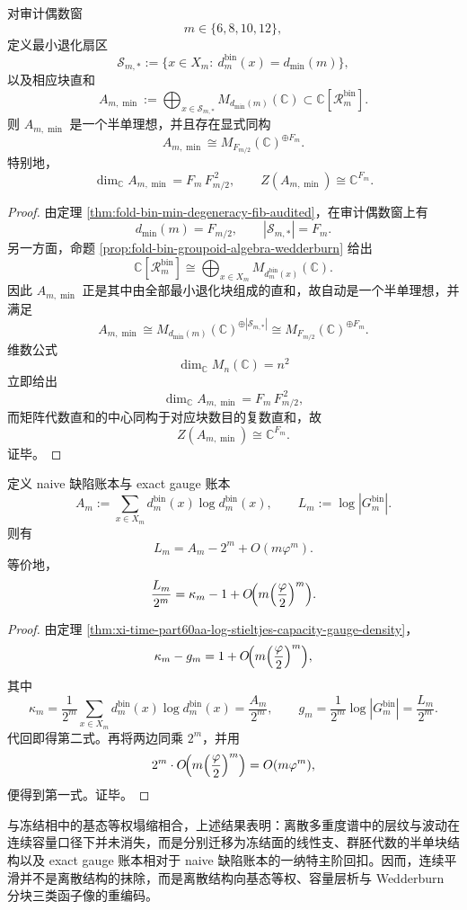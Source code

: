 \begin{proposition}\label{prop:xi-time-part60aaa-audited-even-minideal-fibonacci-semisimple}
对审计偶数窗
\[
m\in\{6,8,10,12\},
\]
定义最小退化扇区
\[
\mathcal S_{m,*}:=\{x\in X_m:\ d_m^{\mathrm{bin}}(x)=d_{\min}(m)\},
\]
以及相应块直和
\[
A_{m,\min}
:=
\bigoplus_{x\in\mathcal S_{m,*}}M_{d_{\min}(m)}(\mathbb C)
\subset
\mathbb C[\mathcal R_m^{\mathrm{bin}}].
\]
则 \(A_{m,\min}\) 是一个半单理想，并且存在显式同构
\[
A_{m,\min}\cong M_{F_{m/2}}(\mathbb C)^{\oplus F_m}.
\]
特别地，
\[
\dim_{\mathbb C}A_{m,\min}=F_m\,F_{m/2}^{\,2},
\qquad
Z(A_{m,\min})\cong \mathbb C^{F_m}.
\]
\end{proposition}
\begin{proof}
由定理 \ref{thm:fold-bin-min-degeneracy-fib-audited}，在审计偶数窗上有
\[
d_{\min}(m)=F_{m/2},
\qquad
|\mathcal S_{m,*}|=F_m.
\]
另一方面，命题 \ref{prop:fold-bin-groupoid-algebra-wedderburn} 给出
\[
\mathbb C[\mathcal R_m^{\mathrm{bin}}]
\cong
\bigoplus_{x\in X_m}M_{d_m^{\mathrm{bin}}(x)}(\mathbb C).
\]
因此 \(A_{m,\min}\) 正是其中由全部最小退化块组成的直和，故自动是一个半单理想，并满足
\[
A_{m,\min}
\cong
M_{d_{\min}(m)}(\mathbb C)^{\oplus |\mathcal S_{m,*}|}
\cong
M_{F_{m/2}}(\mathbb C)^{\oplus F_m}.
\]
维数公式
\[
\dim_{\mathbb C}M_n(\mathbb C)=n^2
\]
立即给出
\[
\dim_{\mathbb C}A_{m,\min}=F_m\,F_{m/2}^{\,2},
\]
而矩阵代数直和的中心同构于对应块数目的复数直和，故
\[
Z(A_{m,\min})\cong \mathbb C^{F_m}.
\]
证毕。
\end{proof}

\begin{corollary}\label{cor:xi-time-part60aaa-one-nat-unnormalized-ledger-rebate}
定义 naive 缺陷账本与 exact gauge 账本
\[
A_m:=\sum_{x\in X_m}d_m^{\mathrm{bin}}(x)\log d_m^{\mathrm{bin}}(x),
\qquad
L_m:=\log|G_m^{\mathrm{bin}}|.
\]
则有
\[
L_m
=
A_m-2^m+O(m\varphi^m).
\]
等价地，
\[
\frac{L_m}{2^m}
=
\kappa_m-1+O\!\Bigl(m\Bigl(\frac{\varphi}{2}\Bigr)^m\Bigr).
\]
\end{corollary}
\begin{proof}
由定理 \ref{thm:xi-time-part60aa-log-stieltjes-capacity-gauge-density}，
\[
\kappa_m-g_m
=
1+O\!\Bigl(m\Bigl(\frac{\varphi}{2}\Bigr)^m\Bigr),
\]
其中
\[
\kappa_m=\frac1{2^m}\sum_{x\in X_m}d_m^{\mathrm{bin}}(x)\log d_m^{\mathrm{bin}}(x)=\frac{A_m}{2^m},
\qquad
g_m=\frac1{2^m}\log|G_m^{\mathrm{bin}}|=\frac{L_m}{2^m}.
\]
代回即得第二式。再将两边同乘 \(2^m\)，并用
\[
2^m\cdot O\!\Bigl(m\Bigl(\frac{\varphi}{2}\Bigr)^m\Bigr)=O(m\varphi^m),
\]
便得到第一式。证毕。
\end{proof}

\noindent
与冻结相中的基态等权塌缩相合，上述结果表明：离散多重度谱中的层纹与波动在连续容量口径下并未消失，而是分别迁移为冻结面的线性支、群胚代数的半单块结构以及 exact gauge 账本相对于 naive 缺陷账本的一纳特主阶回扣。因而，连续平滑并不是离散结构的抹除，而是离散结构向基态等权、容量层析与 Wedderburn 分块三类函子像的重编码。

\endinput
